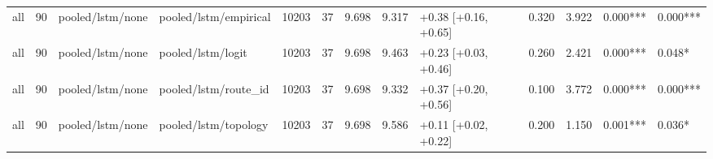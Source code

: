 \begin{tabular}{lrllrrrrlrrll}
all & 90 & pooled/lstm/none & pooled/lstm/empirical & 10203 & 37 & 9.698 & 9.317 & +0.38 [+0.16, +0.65] & 0.320 & 3.922 & 0.000*** & 0.000*** \\
all & 90 & pooled/lstm/none & pooled/lstm/logit & 10203 & 37 & 9.698 & 9.463 & +0.23 [+0.03, +0.46] & 0.260 & 2.421 & 0.000*** & 0.048* \\
all & 90 & pooled/lstm/none & pooled/lstm/route_id & 10203 & 37 & 9.698 & 9.332 & +0.37 [+0.20, +0.56] & 0.100 & 3.772 & 0.000*** & 0.000*** \\
all & 90 & pooled/lstm/none & pooled/lstm/topology & 10203 & 37 & 9.698 & 9.586 & +0.11 [+0.02, +0.22] & 0.200 & 1.150 & 0.001*** & 0.036* \\
\bottomrule
\end{tabular}
